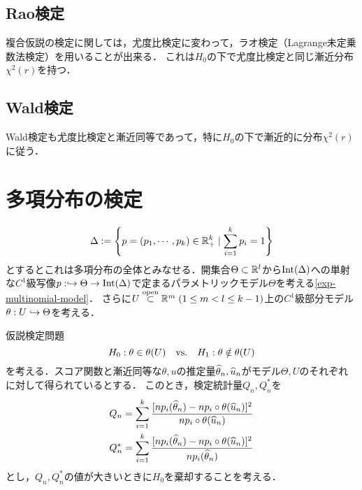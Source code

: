 \documentclass[uplatex,dvipdfmx]{jsreport}
\begin{document}
\subsection{Rao検定}

\begin{tcolorbox}[colframe=ForestGreen, colback=ForestGreen!10!white,breakable,colbacktitle=ForestGreen!40!white,coltitle=black,fonttitle=\bfseries\sffamily,
title=]
    複合仮説の検定に関しては，尤度比検定に変わって，ラオ検定（Lagrange未定乗数法検定）を用いることが出来る．
    これは$H_0$の下で尤度比検定と同じ漸近分布$\chi^2(r)$を持つ．
\end{tcolorbox}

\subsection{Wald検定}

\begin{tcolorbox}[colframe=ForestGreen, colback=ForestGreen!10!white,breakable,colbacktitle=ForestGreen!40!white,coltitle=black,fonttitle=\bfseries\sffamily,
title=]
    Wald検定も尤度比検定と漸近同等であって，特に$H_0$の下で漸近的に分布$\chi^2(r)$に従う．
\end{tcolorbox}

\section{多項分布の検定}

\begin{notation}[モデルの設定]
    \[\Delta:=\left\{p=(p_1,\cdots,p_k)\in\mathbb{R}_+^k\mid\sum^k_{i=1}p_i=1\right\}\]
    とするとこれは多項分布の全体とみなせる．開集合$\Theta\subset\mathbb{R}^l$から$\mathrm{Int}(\Delta)$への単射な$C^1$級写像$p:\hookrightarrow\Theta\to\mathrm{Int}(\Delta)$で定まるパラメトリックモデル$\Theta$を考える\ref{exp-multinomial-model}．
    さらに$U\overset{\mathrm{open}}{\subset}\mathbb{R}^m\;(1\le m<l\le k-1)$上の$C^1$級部分モデル$\theta:U\hookrightarrow\Theta$を考える．
\end{notation}

\begin{problem}
    仮説検定問題
    \[H_0:\theta\in\theta(U)\quad\mathrm{vs.}\quad H_1:\theta\notin\theta(U)\]
    を考える．スコア関数と漸近同等な$\theta,u$の推定量$\widehat{\theta}_n,\widehat{u}_n$がモデル$\Theta,U$のそれぞれに対して得られているとする．
    このとき，検定統計量$Q_n,Q_n^*$を
    \begin{align*}
        Q_n&=\sum^k_{i=1}\frac{[np_i(\widehat{\theta}_n)-np_i\circ\theta(\widehat{u}_n)]^2}{np_i\circ\theta(\widehat{u}_n)}\\
        Q_n^*&=\sum^k_{i=1}\frac{[np_i(\widehat{\theta}_n)-np_i\circ\theta(\widehat{u}_n)]^2}{np_i(\widehat{\theta}_n)}
    \end{align*}
    とし，$Q_n,Q_n^*$の値が大きいときに$H_0$を棄却することを考える．
\end{problem}
\end{document}
